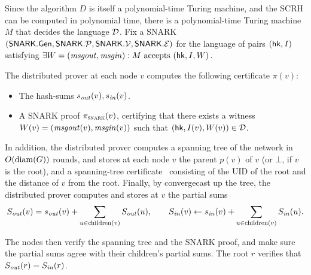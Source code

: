 Since the algorithm $D$ is itself a polynomial-time Turing machine,
and the SCRH can be computed in polynomial time,
there is a polynomial-time Turing machine $M$ that decides the language $\mathcal{D}$.
Fix a SNARK $(\mathsf{SNARK}.\mathsf{Gen}, \mathsf{SNARK}.\mathcal{P}, \mathsf{SNARK}.\mathcal{V}, \mathsf{SNARK}.\mathcal{E})$
for the language
of pairs $(\mathsf{hk}, I)$ satisfying
$\exists W = (\mathit{ msgout }, \mathit{ msgin }) : \text{$M$ accepts $(\mathsf{hk}, I, W)$}$.

The distributed prover at each node $v$ computes the following certificate $\pi(v)$:
\begin{itemize}
	\item The hash-sums $s_{\mathit{ out }}(v), s_{\mathit{ in }}(v)$.
	\item A SNARK proof $\pi_\textsc{snark}(v)$, certifying that there exists a witness $W(v) = (\mathit{ msgout }(v), \mathit{ msgin }(v))$
		such that $(\mathsf{hk}, I(v), W(v)) \in \mathcal{D}$.
\end{itemize}
In addition, the distributed prover computes a spanning tree of the network in $O(\operatorname{diam}(G))$
rounds, and stores at each node $v$ the parent $p(v)$ of $v$ (or $\bot$, if $v$ is the root),
and a spanning-tree certificate~\cite{korman2005proof} consisting
of the UID of the root and the distance of $v$ from the root.
Finally, by convergecast up the tree,
the distributed prover computes and stores at $v$
the partial sums 
\begin{equation*}
	S_{\mathit{ out }}(v) = s_{\mathit{ out }}(v) + \sum_{u \in \mathrm{children}(v)} S_{\mathit{ out }}(u),
	\qquad
	S_{\mathit{ in }}(v) \leftarrow s_{\mathit{ in }}(v) + \sum_{u \in \mathrm{children}(v)} S_{\mathit{ in }}(u).
\end{equation*}

The nodes then verify the spanning tree
and the SNARK proof,
and
make sure the partial sums agree with their children's partial sums.
The root $r$ verifies that $S_{\mathit{ out }}(r) = S_{\mathit{ in }}(r)$.

